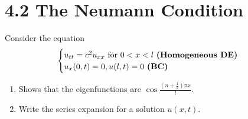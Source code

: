 \documentclass{report}
\begin{document}
\section{4.2 The Neumann Condition}
\begin{question}{}{}
Consider the equation 
\begin{align*}
\begin{cases}
  u_{tt}=c^2u_{xx}\text{ for }0<x<l\text{ \textbf{(Homogeneous DE)} }\\
  u_x(0,t)=0,u(l,t)=0\text{ \textbf{(BC)} }
\end{cases}
\end{align*}
\begin{enumerate}[label=(\alph*)]
  \item Shows that the eigenfunctions are $\cos \frac{(n+ \frac{1}{2})\pi x}{l}$. 
  \item Write the series expansion for a solution $u(x,t)$.
\end{enumerate}
\end{question}
\end{document}
